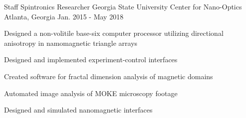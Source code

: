 \begin{cventries}
\cventry
{Staff Spintronics Researcher} %
{Georgia State University Center for Nano-Optics} %
{Atlanta, Georgia} %
{Jan. 2015 - May 2018} %
{ %
\begin{cvitems}
\item {Designed a non-volitile base-six computer processor utilizing directional anisotropy in namomagnetic \newline triangle arrays}
\item {Designed and implemented experiment-control interfaces}
\item {Created software for fractal dimension analysis of magnetic domains}
\item {Automated image analysis of MOKE microscopy footage}
\item {Designed and simulated nanomagnetic interfaces}
\end{cvitems} 
}

\end{cventries}
